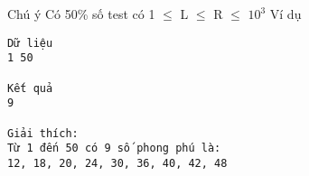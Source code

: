 Chú ý
Có 50\% số test có 1  $\le$  L  $\le$  R  $\le$  $10^{3}$
Ví dụ
\begin{verbatim}
Dữ liệu
1 50

Kết quả
9

Giải thích:
Từ 1 đến 50 có 9 số phong phú là: 
12, 18, 20, 24, 30, 36, 40, 42, 48
\end{verbatim}